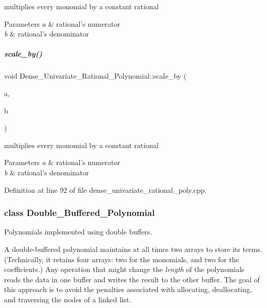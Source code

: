 multiplies every monomial by a constant rational 


\begin{DoxyParams}{Parameters}
{\em a} & rational's numerator \\
\hline
{\em b} & rational's denominator \\
\hline
\end{DoxyParams}
\mbox{\label{group__polygroup_a75113519785d8fba7d957b630bd26a54}} 
\subparagraph{\texorpdfstring{scale\+\_\+by()}{scale\_by()}\hspace{0.1cm}{\footnotesize\ttfamily [2/2]}}
{\footnotesize\ttfamily void Dense\+\_\+\+Univariate\+\_\+\+Rational\+\_\+\+Polynomial\+::scale\+\_\+by (\begin{DoxyParamCaption}\item[{C\+O\+E\+F\+\_\+\+T\+Y\+PE}]{a,  }\item[{U\+C\+O\+E\+F\+\_\+\+T\+Y\+PE}]{b }\end{DoxyParamCaption})}



multiplies every monomial by a constant rational 


\begin{DoxyParams}{Parameters}
{\em a} & rational's numerator \\
\hline
{\em b} & rational's denominator \\
\hline
\end{DoxyParams}


Definition at line 92 of file dense\+\_\+univariate\+\_\+rational\+\_\+poly.\+cpp.

\label{class_double___buffered___polynomial}
\subsubsection{class Double\+\_\+\+Buffered\+\_\+\+Polynomial}
Polynomials implemented using double buffers.

A double-\/buffered polynomial maintains at all times two arrays to store its terms. (Technically, it retains four arrays\+: two for the monomials, and two for the coefficients.) Any operation that might change the {\itshape length} of the polynomials reads the data in one buffer and writes the result to the other buffer. The goal of this approach is to avoid the penalties associated with allocating, deallocating, and traversing the nodes of a linked list. 


